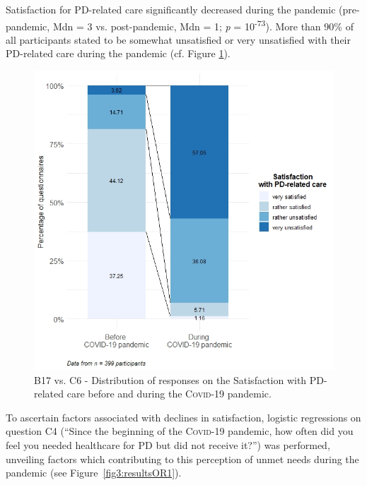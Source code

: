 \documentclass[a4paper,oneside,11pt,english]{scrartcl}
\begin{document}
Satisfaction for \textsc{PD}-related care significantly decreased during the pandemic (pre-pandemic, Mdn = 3 vs. post-pandemic, Mdn = 1; \textit{p} = 10\textsuperscript{-73}). More than 90\% of all participants stated to be somewhat unsatisfied or very unsatisfied with their \textsc{PD}-related care during the pandemic (cf. Figure \ref{fig2:satisfaction}). 

\begin{figure}[h!]
	\centering
	\includegraphics[width=.90\textwidth]{fig2.satisfaction.care.v1.0.jpeg}
	\caption{B17 vs. C6 - Distribution of responses on the Satisfaction with PD-related care before and during the \textsc{Covid}-19 pandemic.}
	\label{fig2:satisfaction}
\end{figure}

To ascertain factors associated with declines in satisfaction, logistic regressions on question C4 (``Since the beginning of the \textsc{Covid}-19 pandemic, how often did you feel you needed healthcare for \textsc{PD} but did not receive it?'') was performed, unveiling factors which contributing to this perception of unmet needs during the pandemic (see \mbox{Figure \ref{fig3:resultsOR1}}). 
\end{document}
